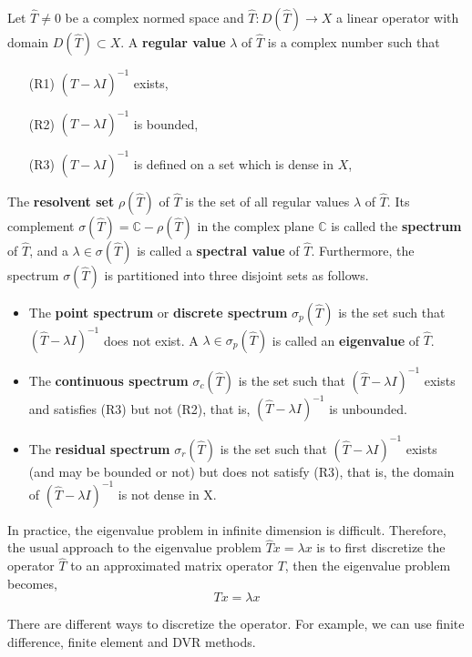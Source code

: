 \begin{definition}
	Let $\hat{T}\neq{0}$ be a complex normed space and $\hat{T}: D(\hat{T}) \to X$ a linear operator with domain $D(\hat{T})\subset X$. A \textbf{regular value} $\lambda$ of $\hat{T}$ is a complex number such that
	\begin{itemize}
		\item [(R1)] $(\hat{T}-\lambda I)^{-1}$ exists,
		\item [(R2)] $(\hat{T}-\lambda I)^{-1}$ is bounded,
		\item [(R3)] $(\hat{T}-\lambda I)^{-1}$ is defined on a set which is dense in $X$,
	\end{itemize}
	
	The \textbf{resolvent set} $\rho(\hat{T})$ of $\hat{T}$ is the set of all regular values $\lambda$ of $\hat{T}$. Its complement $\sigma(\hat{T}) = \mathbb{C} - \rho(\hat{T})$ in the complex plane $\mathbb{C}$ is called the \textbf{spectrum} of $\hat{T}$, and a $\lambda\in \sigma(\hat{T})$ is called a \textbf{spectral value} of $\hat{T}$. Furthermore, the spectrum $\sigma(\hat{T})$ is partitioned into three disjoint sets as follows.
	\begin{itemize}
		\item The \textbf{point spectrum} or \textbf{discrete spectrum} $\sigma_p(\hat{T})$ is the set such that $(\hat{T}-\lambda I)^{-1}$ does not exist. A $\lambda\in\sigma_p(\hat{T})$ is called an \textbf{eigenvalue} of $\hat{T}$.
		\item The \textbf{continuous spectrum} $\sigma_c(\hat{T})$ is the set such that $(\hat{T}-\lambda I)^{-1}$ exists and satisfies (R3) but not (R2), that is, $(\hat{T}-\lambda I)^{-1}$ is unbounded.
		\item The \textbf{residual spectrum} $\sigma_r(\hat{T})$ is the set such that $(\hat{T}-\lambda I)^{-1}$ exists (and may be bounded or not) but does not satisfy (R3), that is, the domain of $(\hat{T}-\lambda I)^{-1}$ is not dense in X.
	\end{itemize}
\end{definition}

In practice, the eigenvalue problem in infinite dimension is difficult. 
Therefore, the usual approach to the eigenvalue problem $\hat{T}x=\lambda x$ is to first discretize the operator $\hat{T}$ to an approximated matrix operator $T$, then the eigenvalue problem becomes,
\[ Tx = \lambda x \]

There are different ways to discretize the operator. For example, we can use finite difference, finite element and DVR methods. 

